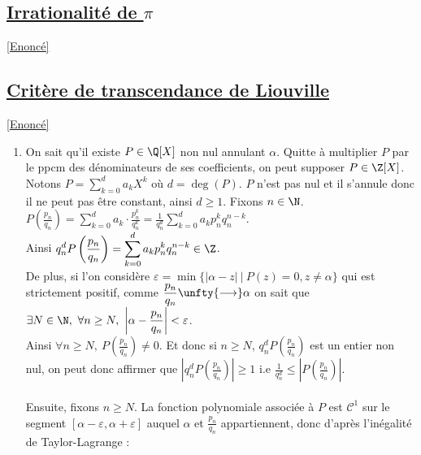 \documentclass[8pt]{book}
\begin{document}
	\subsection{\underline{Irrationalité de $\pi$} }
	\label{Irrationalité de pi corrigé}
	\textcolor{blue}{\hyperref[Irrationalité de pi]{[Enoncé]}}\\
	
	\subsection{\underline{Critère de transcendance de Liouville} }
	\label{Critère de transcendance de Liouville corrigé}
	\textcolor{blue}{\hyperref[Critère de transcendance de Liouville]{[Enoncé]}}\\
	\begin{enumerate}[leftmargin=*]
		\item On sait qu'il existe $P\in \Q[X]$ non nul annulant $\alpha$. Quitte à multiplier $P$ par le ppcm des dénominateurs de ses coefficients, on peut supposer $P\in \Z[X]$. Notons $P=\displaystyle\sum_{k=0}^da_kX^k$ où $d=\deg(P)$. $P$ n'est pas nul et il s'annule donc il ne peut pas être constant, ainsi $d\geq 1$. Fixons $n\in \N$.\\
		$\displaystyle P\left(\frac{p_n}{q_n}\right)=\sum_{k=0}^da_k\cdot\frac{p_n^k}{q_n^k}=\frac{1}{q_n^d}\sum_{k=0}^da_kp_n^kq_n^{n-k}$.\\
		Ainsi $\displaystyle q_n^dP\left(\frac{p_n}{q_n}\right)=\sum_{k=0}^da_kp_n^kq_n^{n-k}\in \Z$.\\
		De plus, si l'on considère $\varepsilon=\min\{|\alpha-z|\ |\ P(z)=0,z\ne \alpha\}$ qui est strictement positif, comme $\displaystyle\frac{p_n}{q_n}\unfty{\longrightarrow}\alpha$ on sait que $\exists N\in \N,\ \forall n\geq N,\ \left|\alpha-\displaystyle\frac{p_n}{q_n}\right|<\varepsilon$.\\
		Ainsi $\forall n\geq N,\ P\left(\displaystyle\frac{p_n}{q_n}\right)\ne 0$. Et donc si $n\geq N$, $q_n^dP\left(\displaystyle\frac{p_n}{q_n}\right)$ est un entier non nul, on peut donc affirmer que $\left|q_n^dP\left(\displaystyle\frac{p_n}{q_n}\right)\right|\geq 1$ i.e $\displaystyle \frac{1}{q_n^d}\leq\left|P\left(\frac{p_n}{q_n}\right)\right|$.\\\\
		Ensuite, fixons $n\geq N$. La fonction polynomiale associée à $P$ est $\mathcal C^1$ sur le segment $[\alpha-\varepsilon,\alpha+\varepsilon]$ auquel $\alpha$ et $\displaystyle\frac{p_n}{q_n}$ appartiennent, donc d'après l'inégalité de Taylor-Lagrange :\\\\

\end{enumerate}
\end{document}

